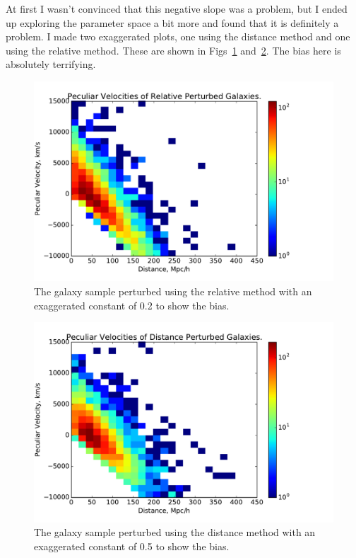 \documentclass[usenatbib]{mn2e}
\begin{document}
At first I wasn't convinced that this negative slope was a problem, but I ended up exploring the parameter space a bit more and found that it is definitely a problem. I made two exaggerated plots, one using the distance method and one using the relative method. These are shown in Figs~\ref{fig:exaggerate} and~\ref{fig:exaggeratenotmod}. The bias here is absolutely terrifying.

\begin{figure}
  \begin{center}
  \includegraphics[scale=0.4]{exaggerate}
  \end{center}
\caption{\small The galaxy sample perturbed using the relative method with an exaggerated constant of 0.2 to show the bias.}
\label{fig:exaggerate}
\end{figure}
\begin{figure}
  \begin{center}
  \includegraphics[scale=0.4]{exaggeratenotmod}
  \end{center}
\caption{\small The galaxy sample perturbed using the distance method with an exaggerated constant of 0.5 to show the bias.}
\label{fig:exaggeratenotmod}
\end{figure}
\end{document}
